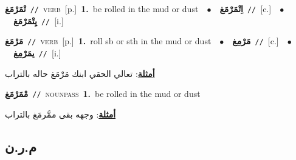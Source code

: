 \documentclass[10pt,a4paper,twoside]{article} %
\begin{document}
\begin{multicols}{2}
{\setlength\topsep{0pt}\textbf{\foreignlanguage{arabic}{تْمَرْمَغ}}\ {\color{gray}\texttt{//}\color{black}}\ \textsc{verb}\ [p.]\ \textbf{1.}~be rolled in the mud or dust\ \ $\bullet$\ \ \setlength\topsep{0pt}\textbf{\foreignlanguage{arabic}{اِتْمَرْمَغ}}\ {\color{gray}\texttt{//}\color{black}}\ [c.]\ \ $\bullet$\ \ \setlength\topsep{0pt}\textbf{\foreignlanguage{arabic}{يِتْمَرْمَغ}}\ {\color{gray}\texttt{//}\color{black}}\ [i.]\ } \vspace{2mm}

{\setlength\topsep{0pt}\textbf{\foreignlanguage{arabic}{مَرْمَغ}}\ {\color{gray}\texttt{//}\color{black}}\ \textsc{verb}\ [p.]\ \textbf{1.}~roll sb or sth in the mud or dust\ \ $\bullet$\ \ \setlength\topsep{0pt}\textbf{\foreignlanguage{arabic}{مَرْمِغ}}\ {\color{gray}\texttt{//}\color{black}}\ [c.]\ \ $\bullet$\ \ \setlength\topsep{0pt}\textbf{\foreignlanguage{arabic}{يمَرْمِغ}}\ {\color{gray}\texttt{//}\color{black}}\ [i.]\  \begin{flushright}\color{gray}\foreignlanguage{arabic}{\textbf{\underline{\foreignlanguage{arabic}{أمثلة}}}: تعالي الحقي ابنك مَرْمَغ حاله بالتراب}\end{flushright}\color{black}} \vspace{2mm}

{\setlength\topsep{0pt}\textbf{\foreignlanguage{arabic}{مْمَرْمَغ}}\ {\color{gray}\texttt{//}\color{black}}\ \textsc{noun\textunderscore pass}\ \textbf{1.}~be rolled in the mud or dust\  \begin{flushright}\color{gray}\foreignlanguage{arabic}{\textbf{\underline{\foreignlanguage{arabic}{أمثلة}}}: وجهه بقى ممَّرمَغ بالتراب}\end{flushright}\color{black}} \vspace{2mm}

\vspace{-3mm}
\subsection*{\color{blue}\foreignlanguage{arabic}{م.ر.ن}\color{blue}{}} 


\end{multicols}
\end{document}
